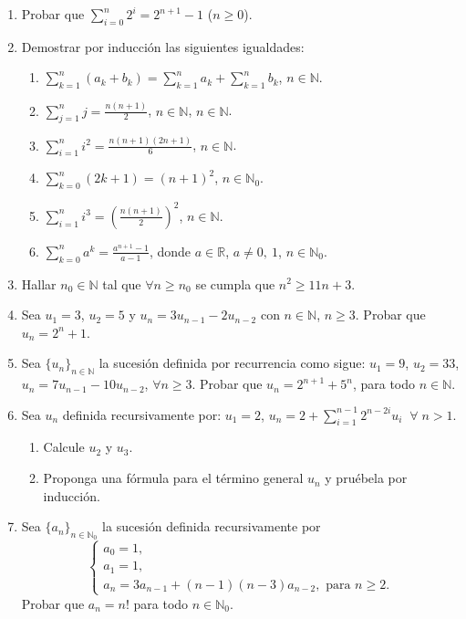 \documentclass[a4paper,12pt,twoside,spanish,reqno]{amsbook}
\numberwithin{equation}{section}
\begin{document}
\begin{enumerate}
\item Probar que $\sum_{i=0}^n 2^i = 2^{n+1} -1$ ($n \ge 0$). 

\item Demostrar por inducción  las siguientes igualdades:
  \begin{enumerate}
  \item  $\displaystyle{ \sum_{k=1}^n (a_k + b_k) = \sum_{k=1}^n a_k + \sum_{k=1}^n b_k}$, $n\in \mathbb N$.
  \item  $\displaystyle{ \sum_{j=1}^n j = \frac{n(n+1)}{2}}$, $n\in \mathbb N$, $n\in \mathbb N$.
  \item  $\displaystyle{ \sum_{i=1}^n i^2 = \frac{n(n+1)(2n+1)}{6}}$, $n\in \mathbb N$.
  \item  $\displaystyle{ \sum_{k=0}^n (2k+1) = (n+1)^2}$, $n\in \mathbb N_0$.
  \item  $\displaystyle{ \sum_{i=1}^n i^3 = \left( \frac{n(n+1)}{2 }\right)^2}$, $n\in \mathbb N$.
  \item  $\displaystyle{ \sum_{k=0}^n a^k = \frac{a^{n+1}-1}{a-1}}$, donde $a\in {\mathbb R}$, $a \neq 0,\ 1$, $n\in \mathbb N_0$.

  \end{enumerate}

\item Hallar $n_0 \in {\mathbb N}$ tal que $\forall n \ge n_0$ se cumpla que $n^2 \ge 11 n + 3$.

\item Sea $u_1=3$, $u_2=5$ y $u_n=3 u_{n-1} - 2 u_{n-2}$ con $n\in \mathbb N$, $n\geq 3$.
Probar que $u_n=2^n+1$.

\item Sea $\{ u_n \}_{n \in \mathbb N}$ la sucesión definida por recurrencia como sigue: $u_1 = 9$, $u_2 = 33$, $u_n = 7u_{n-1} - 10u_{n-2}$, $\forall n \geq 3$. Probar que $u_n = 2^{n+1} + 5^n$, para todo $n \in \mathbb N$.

\item Sea $u_n$ definida recursivamente por: $u_1=2$, $u_n=2+\sum_{i=1}^{n-1}2^{n-2i}u_i \;\;\forall\; n >1$.
\begin{enumerate}
    \item Calcule $u_2$ y $u_3$.
    \item Proponga una fórmula para el término general $u_n$ y pruébela por inducción.
\end{enumerate}

\item  Sea $\{a_n\}_{n\in\mathbb N_0}$ la sucesi\'on definida recursivamente por
$$\begin{cases}
a_0=1, \\a_1=1, \\a_{n} = 3a_{n-1}+(n-1)(n-3)a_{n-2}, \text{ para $n\geq 2$}.
\end{cases}$$
Probar que $a_n=n!$ para todo $n\in \mathbb N_0$.


\end{enumerate}
\end{document}
